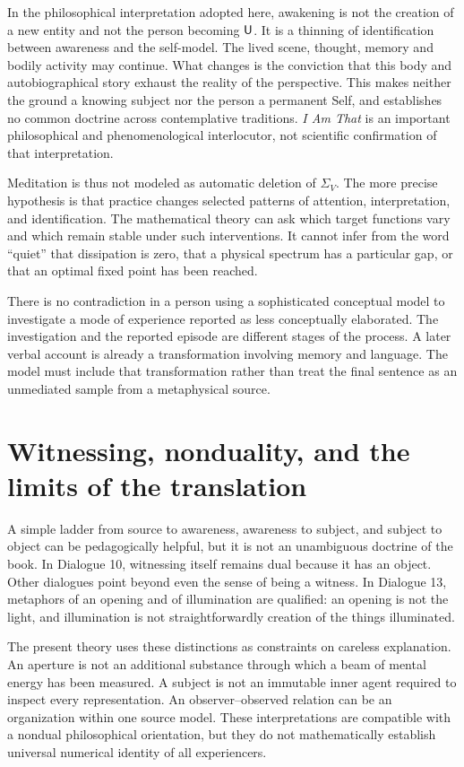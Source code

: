 In the philosophical interpretation adopted here, awakening is not the creation of a new entity and not the person becoming $\mathsf{U}$. It is a thinning of identification between awareness and the self-model. The lived scene, thought, memory and bodily activity may continue. What changes is the conviction that this body and autobiographical story exhaust the reality of the perspective. This makes neither the ground a knowing subject nor the person a permanent Self, and establishes no common doctrine across contemplative traditions. \emph{I Am That} is an important philosophical and phenomenological interlocutor, not scientific confirmation of that interpretation.

Meditation is thus not modeled as automatic deletion of $\Sigma_V$. The more precise hypothesis is that practice changes selected patterns of attention, interpretation, and identification. The mathematical theory can ask which target functions vary and which remain stable under such interventions. It cannot infer from the word ``quiet'' that dissipation is zero, that a physical spectrum has a particular gap, or that an optimal fixed point has been reached.

There is no contradiction in a person using a sophisticated conceptual model to investigate a mode of experience reported as less conceptually elaborated. The investigation and the reported episode are different stages of the process. A later verbal account is already a transformation involving memory and language. The model must include that transformation rather than treat the final sentence as an unmediated sample from a metaphysical source.

\section{Witnessing, nonduality, and the limits of the translation}\label{section:book:witnessing-nonduality-and-the-limits-of-the-translation}
A simple ladder from source to awareness, awareness to subject, and subject to object can be pedagogically helpful, but it is not an unambiguous doctrine of the book. In Dialogue 10, witnessing itself remains dual because it has an object. Other dialogues point beyond even the sense of being a witness. In Dialogue 13, metaphors of an opening and of illumination are qualified: an opening is not the light, and illumination is not straightforwardly creation of the things illuminated.

The present theory uses these distinctions as constraints on careless explanation. An aperture is not an additional substance through which a beam of mental energy has been measured. A subject is not an immutable inner agent required to inspect every representation. An observer--observed relation can be an organization within one source model. These interpretations are compatible with a nondual philosophical orientation, but they do not mathematically establish universal numerical identity of all experiencers.

